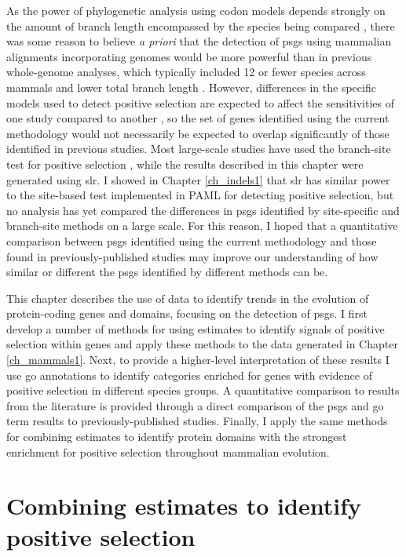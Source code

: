 As the power of phylogenetic analysis using codon models depends
strongly on the amount of branch length encompassed by the species
being compared \citep{Anisimova2001,Anisimova2002}, there was some
reason to believe \emph{a priori} that the detection of \acp{psg}
using mammalian alignments incorporating \lcv genomes would be more
powerful than in previous whole-genome analyses, which typically
included 12 or fewer species across mammals and lower total branch
length \citep{Ellegren2008}. However, differences in the specific
models used to detect positive selection are expected to affect the
sensitivities of one study compared to another \citep{Anisimova2009},
so the set of genes identified using the current methodology would not
necessarily be expected to overlap significantly of those identified
in previous studies. Most large-scale studies have used the
branch-site test for positive selection \citep{Zhang2005}, while the
results described in this chapter were generated using \ac{slr}. I
showed in Chapter \ref{ch_indels1} that \ac{slr} has similar power to
the site-based test implemented in PAML for detecting \sw positive
selection, but no analysis has yet compared the differences in
\acp{psg} identified by site-specific and branch-site methods on a
large scale. For this reason, I hoped that a quantitative comparison
between \acp{psg} identified using the current methodology and those
found in previously-published studies may improve our understanding of
how similar or different the \acp{psg} identified by different methods
can be.

This chapter describes the use of \sw data to identify trends in the
evolution of protein-coding genes and domains, focusing on the
detection of \acp{psg}. I first develop a number of methods for using
\sw estimates to identify signals of positive selection within genes
and apply these methods to the \sw data generated in Chapter
\ref{ch_mammals1}. Next, to provide a higher-level interpretation of
these results I use \ac{go} annotations to identify categories
enriched for genes with evidence of positive selection in different
species groups. A quantitative comparison to results from the
literature is provided through a direct comparison of the \acp{psg}
and \ac{go} term results to previously-published studies. Finally, I
apply the same methods for combining \sw estimates to identify protein
domains with the strongest enrichment for positive selection
throughout mammalian evolution.

\section{Combining \sw estimates to identify positive selection}
\label{sec_combining_sites}

